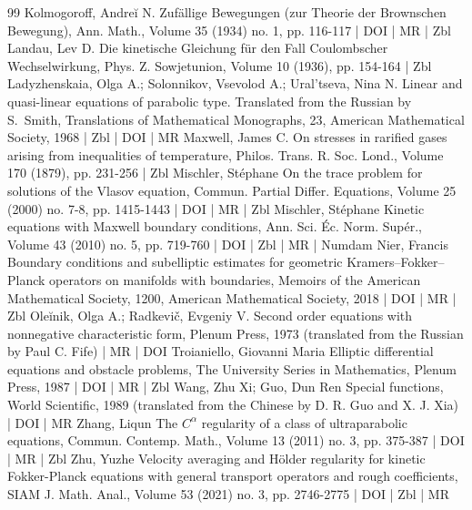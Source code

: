 \documentclass[10pt]{amsart}
\theoremstyle{definition}\newtheorem{defi}[theo]{Definition}\newtheorem{rema}[theo]{Remark}\newtheorem{exam}[theo]{Example}\newtheorem{exem}[theo]{Example}\newtheorem{nota}[theo]{Notation}
\begin{document}
\begin{thebibliography}{99}
 Kolmogoroff, Andreĭ N. Zufällige Bewegungen (zur Theorie der Brownschen Bewegung), Ann. Math., Volume 35 (1934) no. 1, pp. 116-117 | DOI | MR | Zbl
 Landau, Lev D. Die kinetische Gleichung für den Fall Coulombscher Wechselwirkung, Phys. Z. Sowjetunion, Volume 10 (1936), pp. 154-164 | Zbl
 Ladyzhenskaia, Olga A.; Solonnikov, Vsevolod A.; Ural’tseva, Nina N. Linear and quasi-linear equations of parabolic type. Translated from the Russian by S. Smith, Translations of Mathematical Monographs, 23, American Mathematical Society, 1968 | Zbl | DOI | MR
 Maxwell, James C. On stresses in rarified gases arising from inequalities of temperature, Philos. Trans. R. Soc. Lond., Volume 170 (1879), pp. 231-256 | Zbl
 Mischler, Stéphane On the trace problem for solutions of the Vlasov equation, Commun. Partial Differ. Equations, Volume 25 (2000) no. 7-8, pp. 1415-1443 | DOI | MR | Zbl
 Mischler, Stéphane Kinetic equations with Maxwell boundary conditions, Ann. Sci. Éc. Norm. Supér., Volume 43 (2010) no. 5, pp. 719-760 | DOI | Zbl | MR | Numdam
 Nier, Francis Boundary conditions and subelliptic estimates for geometric Kramers–Fokker–Planck operators on manifolds with boundaries, Memoirs of the American Mathematical Society, 1200, American Mathematical Society, 2018 | DOI | MR | Zbl
 Oleĭnik, Olga A.; Radkevič, Evgeniy V. Second order equations with nonnegative characteristic form, Plenum Press, 1973 (translated from the Russian by Paul C. Fife) | MR | DOI
 Troianiello, Giovanni Maria Elliptic differential equations and obstacle problems, The University Series in Mathematics, Plenum Press, 1987 | DOI | MR | Zbl
 Wang, Zhu Xi; Guo, Dun Ren Special functions, World Scientific, 1989 (translated from the Chinese by D. R. Guo and X. J. Xia) | DOI | MR
 Zhang, Liqun The ${C}^\alpha $ regularity of a class of ultraparabolic equations, Commun. Contemp. Math., Volume 13 (2011) no. 3, pp. 375-387 | DOI | MR | Zbl
 Zhu, Yuzhe Velocity averaging and Hölder regularity for kinetic Fokker-Planck equations with general transport operators and rough coefficients, SIAM J. Math. Anal., Volume 53 (2021) no. 3, pp. 2746-2775 | DOI | Zbl | MR
\end{thebibliography}
\end{document}
